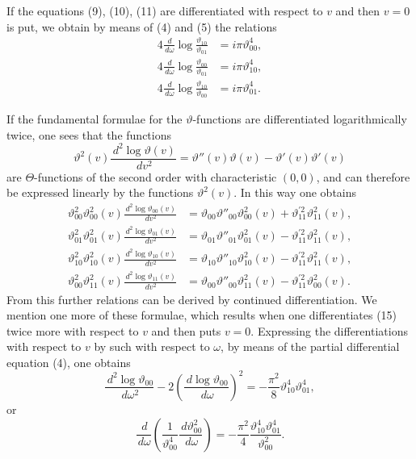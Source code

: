 \documentclass[11pt]{article}
\newcommand{\dd}{\,d}
\newcommand{\tht}{\vartheta}
\begin{document}
If the equations (9), (10), (11) are differentiated with respect to $v$ and then $v=0$ is put, we obtain by means of (4) and (5) the relations
\begin{align}
4\frac{\dd}{\dd\omega}\log\frac{\tht_{10}}{\tht_{01}}&=i\pi\tht_{00}^{4}, \tag{12}\\
4\frac{\dd}{\dd\omega}\log\frac{\tht_{00}}{\tht_{01}}&=i\pi\tht_{10}^{4}, \tag{13}\\
4\frac{\dd}{\dd\omega}\log\frac{\tht_{10}}{\tht_{00}}&=i\pi\tht_{01}^{4}. \tag{14}
\end{align}

If the fundamental formulae for the $\vartheta$-functions are differentiated logarithmically twice, one sees that the functions
\[
\tht^2(v)\frac{\dd^2\log\tht(v)}{\dd v^2}
=\tht''(v)\tht(v)-\tht'(v)\tht'(v)
\]
are $\Theta$-functions of the second order with characteristic $(0,0)$, and can therefore be expressed linearly by the functions $\tht^2(v)$. In this way one obtains
\begin{align}
\tht_{00}^{2}\tht_{00}^{2}(v)\frac{\dd^2\log\tht_{00}(v)}{\dd v^2}
&=\tht_{00}\tht''_{00}\tht_{00}^{2}(v)+\tht_{11}^{\prime 2}\tht_{11}^{2}(v), \tag{15}\\
\tht_{01}^{2}\tht_{01}^{2}(v)\frac{\dd^2\log\tht_{01}(v)}{\dd v^2}
&=\tht_{01}\tht''_{01}\tht_{01}^{2}(v)-\tht_{11}^{\prime 2}\tht_{11}^{2}(v), \tag{16}\\
\tht_{10}^{2}\tht_{10}^{2}(v)\frac{\dd^2\log\tht_{10}(v)}{\dd v^2}
&=\tht_{10}\tht''_{10}\tht_{10}^{2}(v)-\tht_{11}^{\prime 2}\tht_{11}^{2}(v), \tag{17}\\
\tht_{00}^{2}\tht_{11}^{2}(v)\frac{\dd^2\log\tht_{11}(v)}{\dd v^2}
&=\tht_{00}\tht''_{00}\tht_{11}^{2}(v)-\tht_{11}^{\prime 2}\tht_{00}^{2}(v). \tag{18}
\end{align}
From this further relations can be derived by continued differentiation. We mention one more of these formulae, which results when one differentiates (15) twice more with respect to $v$ and then puts $v=0$. Expressing the differentiations with respect to $v$ by such with respect to $\omega$, by means of the partial differential equation (4), one obtains
\[
\frac{\dd^2\log\tht_{00}}{\dd\omega^2}-2\left(\frac{\dd\log\tht_{00}}{\dd\omega}\right)^2
=-\frac{\pi^2}{8}\tht_{10}^{4}\tht_{01}^{4},
\]
or
\begin{equation}
\frac{\dd}{\dd\omega}\left(\frac{1}{\tht_{00}^{4}}\frac{\dd\tht_{00}^{2}}{\dd\omega}\right)
=-\frac{\pi^2}{4}\frac{\tht_{10}^{4}\tht_{01}^{4}}{\tht_{00}^{2}}.
\tag{19}
\end{equation}
\end{document}
